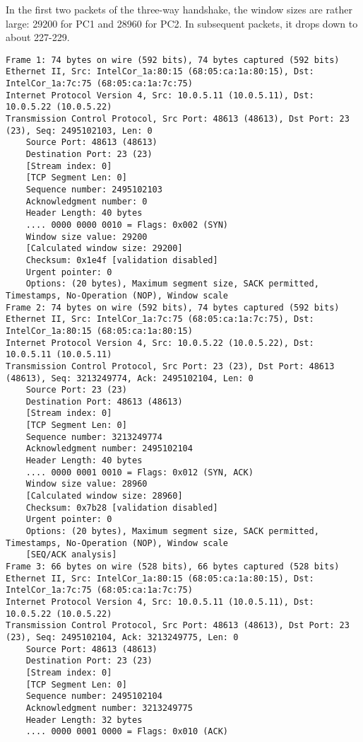 In the first two packets of the three-way handshake, the window sizes are rather large: 29200 for PC1 and 28960 for PC2. In subsequent packets, it drops down to about 227-229.

\begin{lstlisting}
Frame 1: 74 bytes on wire (592 bits), 74 bytes captured (592 bits)
Ethernet II, Src: IntelCor_1a:80:15 (68:05:ca:1a:80:15), Dst: IntelCor_1a:7c:75 (68:05:ca:1a:7c:75)
Internet Protocol Version 4, Src: 10.0.5.11 (10.0.5.11), Dst: 10.0.5.22 (10.0.5.22)
Transmission Control Protocol, Src Port: 48613 (48613), Dst Port: 23 (23), Seq: 2495102103, Len: 0
    Source Port: 48613 (48613)
    Destination Port: 23 (23)
    [Stream index: 0]
    [TCP Segment Len: 0]
    Sequence number: 2495102103
    Acknowledgment number: 0
    Header Length: 40 bytes
    .... 0000 0000 0010 = Flags: 0x002 (SYN)
    Window size value: 29200
    [Calculated window size: 29200]
    Checksum: 0x1e4f [validation disabled]
    Urgent pointer: 0
    Options: (20 bytes), Maximum segment size, SACK permitted, Timestamps, No-Operation (NOP), Window scale
Frame 2: 74 bytes on wire (592 bits), 74 bytes captured (592 bits)
Ethernet II, Src: IntelCor_1a:7c:75 (68:05:ca:1a:7c:75), Dst: IntelCor_1a:80:15 (68:05:ca:1a:80:15)
Internet Protocol Version 4, Src: 10.0.5.22 (10.0.5.22), Dst: 10.0.5.11 (10.0.5.11)
Transmission Control Protocol, Src Port: 23 (23), Dst Port: 48613 (48613), Seq: 3213249774, Ack: 2495102104, Len: 0
    Source Port: 23 (23)
    Destination Port: 48613 (48613)
    [Stream index: 0]
    [TCP Segment Len: 0]
    Sequence number: 3213249774
    Acknowledgment number: 2495102104
    Header Length: 40 bytes
    .... 0000 0001 0010 = Flags: 0x012 (SYN, ACK)
    Window size value: 28960
    [Calculated window size: 28960]
    Checksum: 0x7b28 [validation disabled]
    Urgent pointer: 0
    Options: (20 bytes), Maximum segment size, SACK permitted, Timestamps, No-Operation (NOP), Window scale
    [SEQ/ACK analysis]
Frame 3: 66 bytes on wire (528 bits), 66 bytes captured (528 bits)
Ethernet II, Src: IntelCor_1a:80:15 (68:05:ca:1a:80:15), Dst: IntelCor_1a:7c:75 (68:05:ca:1a:7c:75)
Internet Protocol Version 4, Src: 10.0.5.11 (10.0.5.11), Dst: 10.0.5.22 (10.0.5.22)
Transmission Control Protocol, Src Port: 48613 (48613), Dst Port: 23 (23), Seq: 2495102104, Ack: 3213249775, Len: 0
    Source Port: 48613 (48613)
    Destination Port: 23 (23)
    [Stream index: 0]
    [TCP Segment Len: 0]
    Sequence number: 2495102104
    Acknowledgment number: 3213249775
    Header Length: 32 bytes
    .... 0000 0001 0000 = Flags: 0x010 (ACK)

\end{lstlisting}
